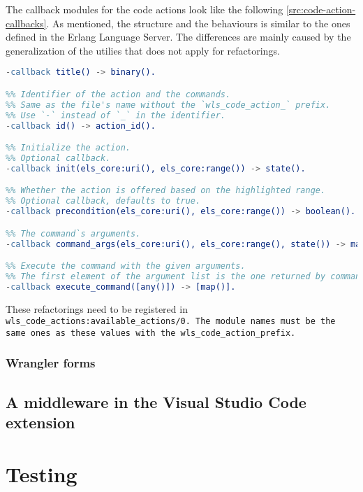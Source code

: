 The callback modules for the code actions look like the following \ref{src:code-action-callbacks}. As mentioned, the structure and the behaviours is similar to the ones defined in the Erlang Language Server. The differences are mainly caused by the generalization of the utilies that does not apply for refactorings.

\begin{lstlisting}[language=erlang]
%% Title which is shown to the user.
-callback title() -> binary().

%% Identifier of the action and the commands. 
%% Same as the file's name without the `wls_code_action_` prefix.
%% Use `-` instead of `_` in the identifier.
-callback id() -> action_id().

%% Initialize the action. 
%% Optional callback.
-callback init(els_core:uri(), els_core:range()) -> state().

%% Whether the action is offered based on the highlighted range. 
%% Optional callback, defaults to true.
-callback precondition(els_core:uri(), els_core:range()) -> boolean().

%% The command`s arguments.
-callback command_args(els_core:uri(), els_core:range(), state()) -> map().

%% Execute the command with the given arguments. 
%% The first element of the argument list is the one returned by command_args. 
-callback execute_command([any()]) -> [map()].
\end{lstlisting}

These refactorings need to be registered in \tt wls\_code\_actions:available\_actions/0\rm . 
The module names must be the same ones as these values with the \tt wls\_code\_action\_\rm prefix.


\subsubsection{Wrangler forms}
\label{src:wrangler-forms}


\label{src:behaviours}

\subsection{A middleware in the Visual Studio Code extension}
\label{src:middleware}


\section{Testing}
